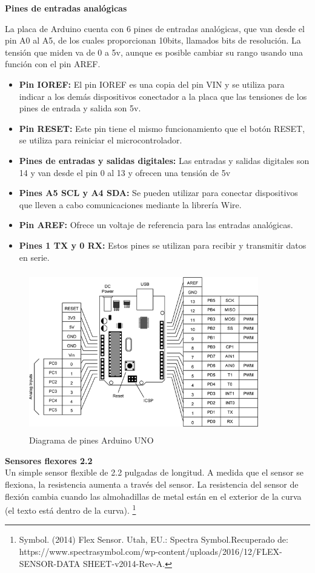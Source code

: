 \documentclass[12pt]{report}%
\begin{document}
\textbf{Pines de entradas analógicas}

La placa de Arduino cuenta con 6 pines de entradas analógicas, que van desde el pin A0 al A5, de los cuales proporcionan 10bits, llamados bits de resolución. La tensión que miden va de 0 a 5v, aunque es posible cambiar su rango usando una función con el pin AREF.

\begin{itemize}
\item \textbf{Pin IOREF:} El pin IOREF es una copia del pin VIN y se utiliza para indicar a los demás dispositivos conectador a la placa que las tensiones de los pines de entrada y salida son 5v.
\item \textbf{Pin RESET:} Este pin tiene el mismo funcionamiento que el botón RESET, se utiliza para reiniciar el microcontrolador.
\item \textbf{Pines de entradas y salidas digitales:} Las entradas y salidas digitales son 14 y van desde el pin 0 al 13 y ofrecen una tensión de 5v
\item \textbf{Pines  A5 SCL y A4 SDA:} Se pueden utilizar para conectar dispositivos que lleven a cabo comunicaciones mediante la librería Wire.
\item \textbf{Pin AREF:} Ofrece un voltaje de referencia para las entradas analógicas.
\item \textbf{Pines 1 TX y 0 RX:} Estos pines se utilizan para recibir y transmitir datos en serie.
\end{itemize}

\begin{figure}[H]
\centering
	 \includegraphics[width=10cm, height=7cm]{Arduino1pines.png}
	 \caption{Diagrama de pines Arduino UNO}%
	 	 \label{fig:Arduinopines}
\end{figure}

\textbf{Sensores flexores 2.2}\\
Un simple sensor flexible de 2.2 pulgadas de longitud. A medida que el sensor se flexiona, la resistencia aumenta a través del sensor.	
La resistencia del sensor de flexión cambia cuando las almohadillas de metal están en el exterior de la curva (el texto está dentro de la curva). \footnote{ Symbol. (2014) Flex Sensor. Utah, EU.: Spectra Symbol.Recuperado de: https://www.spectrasymbol.com/wp-content/uploads/2016/12/FLEX-SENSOR-DATA SHEET-v2014-Rev-A.}
\end{document}
